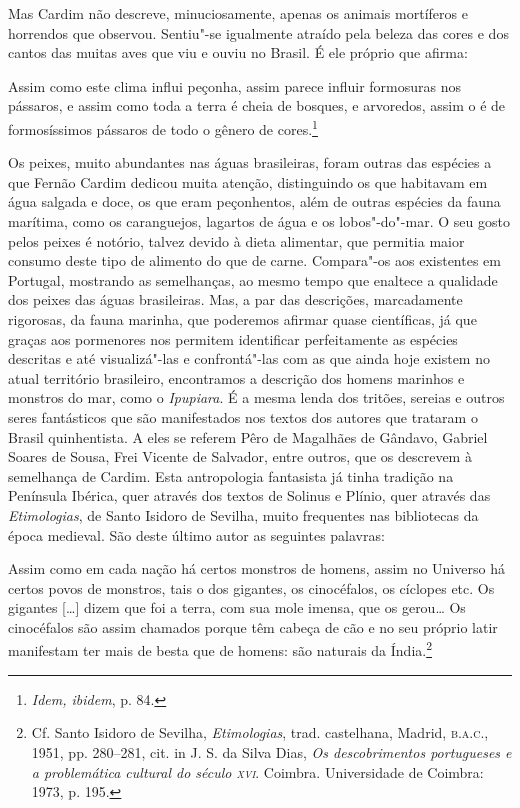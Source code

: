 Mas Cardim não descreve, minuciosamente, apenas os animais
mortíferos e horrendos que observou. Sentiu"-se igualmente atraído pela
beleza das cores e dos cantos das muitas aves que viu e ouviu no
Brasil. É ele próprio que afirma:

\begin{hedraquote}
Assim como este clima influi peçonha, assim parece influir formosuras nos pássaros, e assim
como toda a terra é cheia de bosques, e arvoredos, assim o é de formosíssimos pássaros de 
todo o gênero de cores.\footnote{  \textit{Idem, ibidem}, p. 84.}
\end{hedraquote}

 Os peixes, muito abundantes nas águas brasileiras, foram
outras das espécies a que Fernão Cardim dedicou muita atenção,
distinguindo os que habitavam em água salgada e doce, os que eram
peçonhentos, além de outras espécies da fauna marítima, como os
caranguejos, lagartos de água e os lobos"-do"-mar. O seu gosto pelos
peixes é notório, talvez devido à dieta alimentar, que permitia maior
consumo deste tipo de alimento do que de carne. Compara"-os aos
existentes em Portugal, mostrando as semelhanças, ao mesmo tempo que
enaltece a qualidade dos peixes das águas brasileiras. Mas, a par das
descrições, marcadamente rigorosas, da fauna marinha, que poderemos
afirmar quase científicas, já que graças aos pormenores nos permitem
identificar perfeitamente as espécies descritas e até visualizá"-las e
confrontá"-las com as que ainda hoje existem no atual território
brasileiro, encontramos a descrição dos homens marinhos e monstros do
mar, como o \textit{Ipupiara}. É a mesma lenda dos tritões,
sereias e outros seres fantásticos que são manifestados nos textos dos
autores que trataram o Brasil quinhentista. A eles se referem Pêro de
Magalhães de Gândavo, Gabriel Soares de Sousa, Frei Vicente de
Salvador, entre outros, que os descrevem à semelhança de Cardim. Esta
antropologia fantasista já tinha tradição na Península Ibérica, quer
através dos textos de Solinus e Plínio, quer através das
\textit{Etimologias}, de Santo Isidoro de Sevilha, muito frequentes nas
bibliotecas da época medieval. São deste último autor as seguintes palavras:

\begin{hedraquote}
Assim como em cada nação há certos monstros de homens,
assim no Universo há certos povos de monstros, tais o dos gigantes, os
cinocéfalos, os cíclopes etc. Os gigantes [\ldots{}] dizem que foi a terra,
com sua mole imensa, que os gerou\ldots{} Os cinocéfalos são assim chamados
porque têm cabeça de cão e no seu próprio latir manifestam ter mais de
besta que de homens: são naturais da Índia.\footnote{ Cf. Santo Isidoro 
de Sevilha, \textit{Etimologias}, trad. castelhana, Madrid, \textsc{b.a.c.}, 1951, 
pp. 280--281, cit. in J. S. da Silva Dias, \textit{Os descobrimentos portugueses 
e a problemática cultural do século \textsc{xvi}}. Coimbra. Universidade de Coimbra: 1973, p. 195.}
\end{hedraquote}

